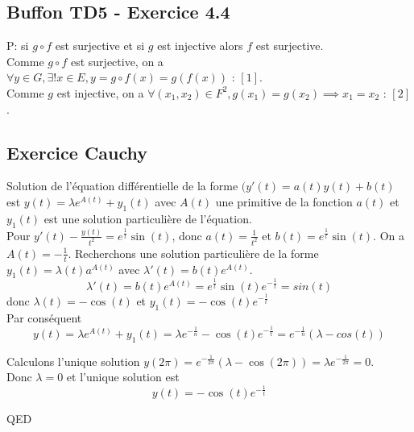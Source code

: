 \documentclass[]{book}
\theoremstyle{definition}
\begin{document}
\subsection*{Buffon TD5 - Exercice 4.4}
P:  si $g \circ f$ est surjective et si $g$ est injective alors $f$ est surjective.\\
Comme $g \circ f$ est surjective, on a $\forall y \in G, \exists !x \in E, y = g \circ f(x)=g(f(x)) \textrm{  : } [1]$.\\
Comme $g$ est injective, on a $\forall (x_1, x_2) \in F^2, g(x_1) = g(x_2) \implies x_1 = x_2 \textrm{  : }[2]$.\\



\newpage
\subsection*{Exercice Cauchy}
Solution de l'\'equation diff\'erentielle de la forme $(y'(t) = a(t)y(t) + b(t)$ est $y(t) = \lambda e^{A(t)}+y_1(t)$ avec $A(t)$ une primitive de la fonction $a(t)$ et $y_1(t)$ est une solution particuli\`ere de l'\'equation.\\

Pour $y'(t) - \frac{y(t)}{t^2} = e^{\frac{1}{t}}\sin(t)$, donc $a(t) = \frac{1}{t^2}$ et $b(t)= e^{\frac{1}{t}}\sin(t)$. On a $A(t) = -\frac{1}{t}$. Recherchons une  solution particuli\`ere de la forme $y_1(t) = \lambda(t)a^{A(t)}$ avec $\lambda'(t) = b(t)e^{A(t)}$.
$$\lambda'(t) = b(t)e^{A(t)} = e^{\frac{1}{t}}\sin(t)e^{-\frac{1}{t}} = sin(t)$$
donc $\lambda(t) =  -\cos(t)$ et $y_1(t) = -\cos(t)e^{-\frac{1}{t}}$\\
Par cons\'equent
$$y(t) = \lambda e^{A(t)}+y_1(t) = \lambda e^{-\frac{1}{n}} -\cos(t)e^{-\frac{1}{t}} = e^{-\frac{1}{n}}(\lambda-cos(t))$$

Calculons l'unique solution $y(2\pi) =  e^{-\frac{1}{2\pi}}(\lambda-\cos(2\pi)) = \lambda e^{-\frac{1}{2\pi}} = 0$.\\
Donc $\lambda = 0$ et l'unique solution est 
$$y(t) = -\cos(t)e^{-\frac{1}{t}}$$


QED
\end{document}
